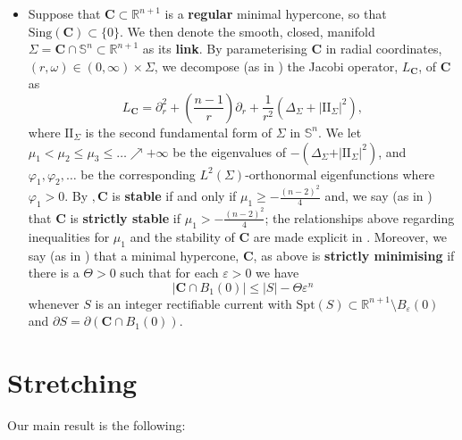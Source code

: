 \documentclass[12pt]{article}
\begin{document}
\begin{itemize}
     \item Suppose that $\mathbf{C} \subset \mathbb{R}^{n+1}$ is a \textbf{regular} minimal hypercone, so that $\mathrm{Sing}(\mathbf{C}) \subset \{0\}$. We then denote the smooth, closed, manifold $\Sigma = \mathbf{C} \cap \mathbb{S}^n \subset \mathbb{R}^{n+1}$ as its \textbf{link}. By parameterising $\mathbf{C}$ in radial coordinates, $(r,\omega) \in (0,\infty) \times \Sigma$, we decompose (as in \cite{S68}) the Jacobi operator, $L_{\mathbf{C}}$, of $\mathbf{C}$ as
    $$L_{\mathbf{C}} = \partial^2_r + \left(\frac{n-1}{r}\right)\partial_r + \frac{1}{r^2}(\Delta_\Sigma + |\mathrm{I\!I}_\Sigma|^2),$$
    where $\mathrm{I\!I}_\Sigma$ is the second fundamental form of $\Sigma$ in $\mathbb{S}^n$. We let $\mu_1 < \mu_2 \leq \mu_3 \leq \ldots \nearrow + \infty$ be the eigenvalues of $- (\Delta_\Sigma + \vert \mathrm{I\!I}_\Sigma \vert^2)$, and $\varphi_1, \varphi_2, \ldots$ be the corresponding $L^2(\Sigma)$-orthonormal eigenfunctions where $\varphi_1 > 0$. By \cite{S68}$, \mathbf{C}$ is \textbf{stable} if and only if $\mu_1\geq -\frac{(n-2)^2}{4}$ and, we say (as in \cite{CHS84}) that $\mathbf{C}$ is \textbf{strictly stable} if $\mu_1 > -\frac{(n-2)^2}{4}$; the relationships above regarding inequalities for $\mu_1$ and the stability of $\mathbf{C}$ are made explicit in \cite[Section 4]{CHS84}. Moreover, we say (as in \cite{HS85}) that a minimal hypercone, $\mathbf{C}$, as above is \textbf{strictly minimising} if there is a $\Theta > 0$ such that for each $\varepsilon > 0$ we have 
    $$|\mathbf{C} \cap B_1(0)| \leq |S| - \Theta\varepsilon^n$$
    whenever $S$ is an integer rectifiable current with $\mathrm{Spt}(S) \subset \mathbb{R}^{n+1} \setminus B_\varepsilon(0)$ and $\partial S = \partial (\mathbf{C} \cap B_1(0))$.
    
\end{itemize}



\section{Stretching}\label{sec: stretching}

Our main result is the following:
\end{document}

